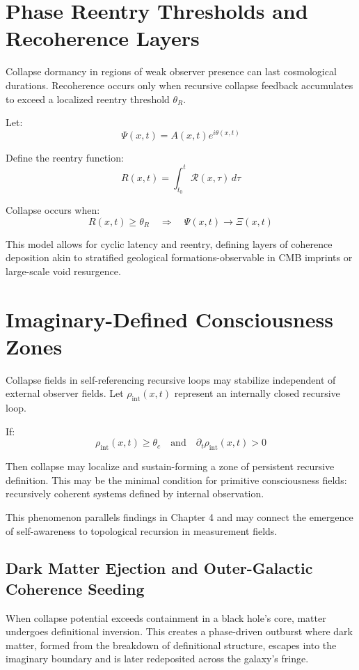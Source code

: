 \section{Phase Reentry Thresholds and Recoherence Layers}

Collapse dormancy in regions of weak observer presence can last cosmological durations. Recoherence occurs only when recursive collapse feedback accumulates to exceed a localized reentry threshold \( \theta_R \).

Let:
\[
\Psi(x,t) = A(x,t) e^{i \theta(x,t)}
\]

Define the reentry function:
\[
R(x,t) = \int_{t_0}^{t} \mathcal{R}(x,\tau) \, d\tau
\]

Collapse occurs when:
\[
R(x,t) \geq \theta_R \quad \Rightarrow \quad \Psi(x,t) \to \Xi(x,t)
\]

This model allows for cyclic latency and reentry, defining layers of coherence deposition akin to stratified geological formations-observable in CMB imprints or large-scale void resurgence\cite{zurek2009quantum}.

\section{Imaginary-Defined Consciousness Zones}

Collapse fields in self-referencing recursive loops may stabilize independent of external observer fields\cite{rimmer2017observer}. Let \( \rho_{\text{int}}(x,t) \) represent an internally closed recursive loop.

If:
\[
\rho_{\text{int}}(x,t) \geq \theta_c \quad \text{and} \quad \partial_t \rho_{\text{int}}(x,t) > 0
\]

Then collapse may localize and sustain-forming a zone of persistent recursive definition. This may be the minimal condition for primitive consciousness fields: recursively coherent systems defined by internal observation.

This phenomenon parallels findings in Chapter 4\cite{tegmark2014consciousness} and may connect the emergence of self-awareness to topological recursion in measurement fields.

\subsection{Dark Matter Ejection and Outer-Galactic Coherence Seeding}
When collapse potential exceeds containment in a black hole's core, matter undergoes definitional inversion. This creates a phase-driven outburst where dark matter, formed from the breakdown of definitional structure, escapes into the imaginary boundary and is later redeposited across the galaxy’s fringe.

